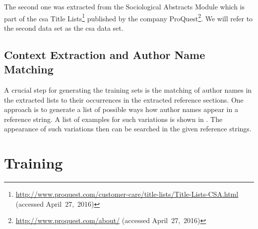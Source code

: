 \bigskip

The second one was extracted from the Sociological Abstracts Module which is part of the \gls{csa} Title Lists\footnote{\url{http://www.proquest.com/customer-care/title-lists/Title-Lists-CSA.html} (accessed April~27,~2016)} published by the company ProQuest\footnote{\url{http://www.proquest.com/about/} (accessed April~27,~2016)}.
We will refer to the second data set as the \gls{csa} data set.


\subsection{Context Extraction and Author Name Matching}
A crucial step for generating the training sets is the matching of author names in the extracted lists to their occurrences in the extracted reference sections.
One approach is to generate a list of possible ways how author names appear in a reference string.
A list of examples for such variations is shown in .
The appearance of such variations then can be searched in the given reference strings.







\section{Training }\label{sec:ae-training-crfs}


